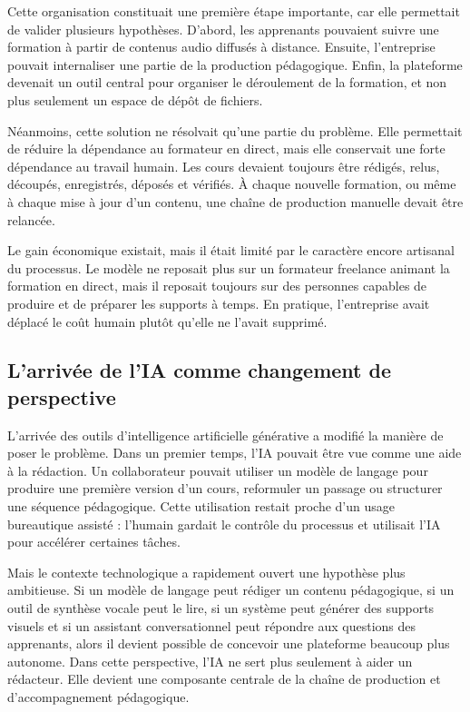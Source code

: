 Cette organisation constituait une première étape importante, car elle permettait de
valider plusieurs hypothèses. D'abord, les apprenants pouvaient suivre une formation à
partir de contenus audio diffusés à distance. Ensuite, l'entreprise pouvait internaliser une
partie de la production pédagogique. Enfin, la plateforme devenait un outil central pour
organiser le déroulement de la formation, et non plus seulement un espace de dépôt de
fichiers.

Néanmoins, cette solution ne résolvait qu'une partie du problème. Elle permettait de
réduire la dépendance au formateur en direct, mais elle conservait une forte dépendance
au travail humain. Les cours devaient toujours être rédigés, relus, découpés, enregistrés,
déposés et vérifiés. À chaque nouvelle formation, ou même à chaque mise à jour d'un
contenu, une chaîne de production manuelle devait être relancée.

Le gain économique existait, mais il était limité par le caractère encore artisanal du
processus. Le modèle ne reposait plus sur un formateur freelance animant la formation
en direct, mais il reposait toujours sur des personnes capables de produire et de préparer
les supports à temps. En pratique, l'entreprise avait déplacé le coût humain plutôt qu'elle
ne l'avait supprimé.

\subsection{L'arrivée de l'IA comme changement de perspective}

L'arrivée des outils d'intelligence artificielle générative a modifié la manière de poser le
problème. Dans un premier temps, l'IA pouvait être vue comme une aide à la rédaction.
Un collaborateur pouvait utiliser un modèle de langage pour produire une première
version d'un cours, reformuler un passage ou structurer une séquence pédagogique. Cette
utilisation restait proche d'un usage bureautique assisté : l'humain gardait le contrôle du
processus et utilisait l'IA pour accélérer certaines tâches.

Mais le contexte technologique a rapidement ouvert une hypothèse plus ambitieuse. Si
un modèle de langage peut rédiger un contenu pédagogique, si un outil de synthèse vocale
peut le lire, si un système peut générer des supports visuels et si un assistant
conversationnel peut répondre aux questions des apprenants, alors il devient possible de
concevoir une plateforme beaucoup plus autonome. Dans cette perspective, l'IA ne sert
plus seulement à aider un rédacteur. Elle devient une composante centrale de la chaîne de
production et d'accompagnement pédagogique.

